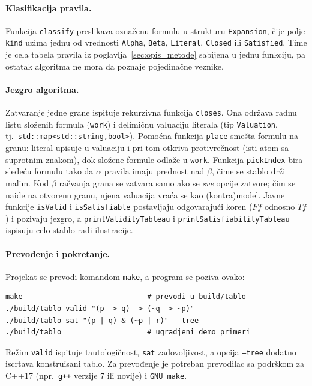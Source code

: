 \documentclass[a4paper,10pt]{article}
\begin{document}
\paragraph{Klasifikacija pravila.}
Funkcija \texttt{classify} preslikava označenu formulu u strukturu
\texttt{Expansion}, čije polje \texttt{kind} uzima jednu od vrednosti
\texttt{Alpha}, \texttt{Beta}, \texttt{Literal}, \texttt{Closed} ili
\texttt{Satisfied}. Time je cela tabela pravila iz
poglavlja~\ref{sec:opis_metode} sabijena u jednu funkciju, pa ostatak
algoritma ne mora da poznaje pojedinačne veznike.

\paragraph{Jezgro algoritma.}
Zatvaranje jedne grane ispituje rekurzivna funkcija \texttt{closes}. Ona
održava radnu listu složenih formula (\texttt{work}) i delimičnu valuaciju
literala (tip \texttt{Valuation}, tj.\ \texttt{std::map<std::string,bool>}).
Pomoćna funkcija \texttt{place} smešta formulu na granu: literal upisuje u
valuaciju i pri tom otkriva protivrečnost (isti atom sa suprotnim znakom),
dok složene formule odlaže u \texttt{work}. Funkcija \texttt{pickIndex} bira
sledeću formulu tako da $\alpha$ pravila imaju prednost nad $\beta$, čime se
stablo drži malim. Kod $\beta$ račvanja grana se zatvara samo ako se
\emph{sve} opcije zatvore; čim se naiđe na otvorenu granu, njena valuacija
vraća se kao (kontra)model. Javne funkcije \texttt{isValid} i
\texttt{isSatisfiable} postavljaju odgovarajući koren ($Ff$ odnosno $Tf$) i
pozivaju jezgro, a \texttt{printValidityTableau} i
\texttt{printSatisfiabilityTableau} ispisuju celo stablo radi ilustracije.

\paragraph{Prevođenje i pokretanje.}
Projekat se prevodi komandom \texttt{make}, a program se poziva ovako:
\begin{verbatim}
make                             # prevodi u build/tablo
./build/tablo valid "(p -> q) -> (~q -> ~p)"
./build/tablo sat "(p | q) & (~p | r)" --tree
./build/tablo                    # ugradjeni demo primeri
\end{verbatim}
Režim \texttt{valid} ispituje tautologičnost, \texttt{sat} zadovoljivost, a
opcija \texttt{--tree} dodatno iscrtava konstruisani tablo. Za prevođenje je
potreban prevodilac sa podrškom za C++17 (npr.\ \texttt{g++} verzije 7 ili
novije) i \texttt{GNU make}.
\end{document}
